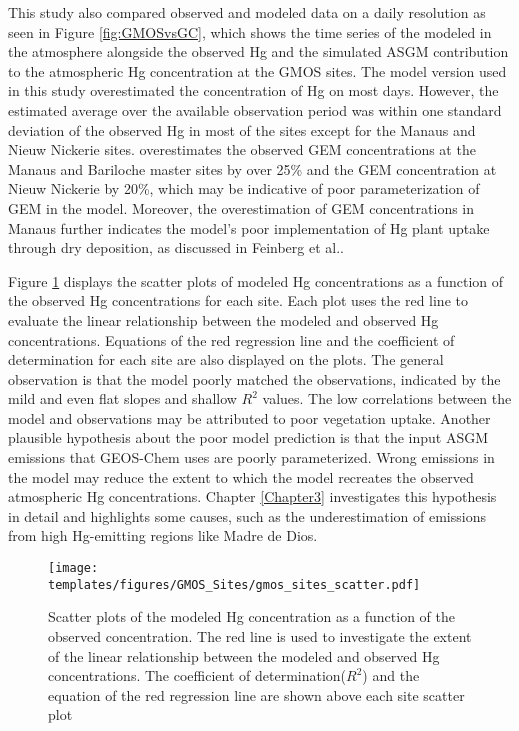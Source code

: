 \begin{flushleft}


 This study also compared observed and modeled data on a daily resolution as seen in Figure \ref{fig:GMOSvsGC}, which shows the time series of the modeled \hgc in the atmosphere alongside the observed Hg and the simulated ASGM contribution to the atmospheric Hg concentration at the GMOS sites. The \gc model version used in this study overestimated the concentration of Hg on most days. However, the \gc estimated average \hgc over the available observation period was within one standard deviation of the observed Hg in most of the sites except for the Manaus and Nieuw Nickerie sites. \gcs overestimates the observed GEM concentrations at the Manaus and Bariloche master sites by over 25\%  and the GEM concentration at Nieuw Nickerie by 20\%, which may be indicative of poor parameterization of GEM in the model. Moreover, the overestimation of GEM concentrations in Manaus further indicates the model's poor implementation of Hg plant uptake through dry deposition, as discussed in Feinberg et al.\cite{feinberg_evaluating_2022}.
\end{flushleft}

\begin{flushleft}
 Figure \ref{fig:gmos_sites_scatter} displays the scatter plots of modeled Hg concentrations as a function of the observed Hg concentrations for each site. Each plot uses the red line to evaluate the linear relationship between the modeled and observed Hg concentrations. Equations of the red regression line and the coefficient of determination for each site are also displayed on the plots. The general observation is that the model poorly matched the observations, indicated by the  mild and even flat slopes and shallow $R^2$ values. The low correlations between the model and observations may be attributed to poor vegetation uptake\cite{feinberg_evaluating_2022}. Another plausible hypothesis about the poor model prediction is that the input ASGM emissions that GEOS-Chem uses are poorly parameterized. Wrong emissions in the model may reduce the extent to which the model recreates the observed atmospheric Hg concentrations. Chapter \ref{Chapter3} investigates this hypothesis in detail and highlights some causes, such as the underestimation of emissions from high Hg-emitting regions like Madre de Dios.
 \end{flushleft}


 \begin{figure}[H]
\texttt{[image: templates/figures/GMOS\_Sites/gmos\_sites\_scatter.pdf]}
\centering
\caption[Scatter plots of the modeled Hg concentration as a function of the observed concentration.]{Scatter plots of the modeled Hg concentration as a function of the observed concentration. The red line is used to investigate the extent of the linear relationship between the modeled and observed Hg concentrations. The coefficient of determination($R^2$) and the equation of the red regression line are shown above each site scatter plot}
\label{fig:gmos_sites_scatter}
\end{figure}
\FloatBarrier

